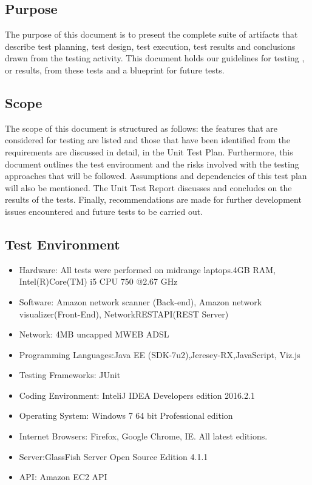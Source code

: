 \documentclass[hidelinks,a4paper,12pt]{article}
\begin{document}
\subsection{Purpose}
The purpose of this document is to present the complete suite of artifacts that describe test planning, test design, test execution, test results and conclusions drawn from the testing activity. This document holds our guidelines for testing , or results, from these tests and a blueprint for future tests.


\subsection{Scope}
The scope of this document is structured as follows: the features that are considered for
testing are listed and those that have been identified from the requirements are
discussed in detail, in the Unit Test Plan. Furthermore, this document outlines the test environment
and the risks involved with the testing approaches that will be followed. Assumptions and
dependencies of this test plan will also be mentioned. The Unit Test Report
discusses and concludes on the results of the tests. Finally, recommendations are made for further development issues encountered and future tests to be carried out.

\subsection{ Test Environment}



\begin{itemize}
  \item Hardware: All tests were performed on midrange laptops.4GB RAM, Intel(R)Core(TM) i5 CPU 750 @2.67 GHz
\item Software: Amazon network scanner (Back-end), Amazon network visualizer(Front-End), NetworkRESTAPI(REST Server)
\item Network: 4MB uncapped MWEB ADSL
  \item Programming Languages:Java EE (SDK-7u2),Jeresey-RX,JavaScript, Viz.js
  \item Testing Frameworks: JUnit
\item Coding Environment: InteliJ IDEA Developers edition 2016.2.1
\item Operating System: Windows 7 64 bit Professional edition
\item Internet Browsers: Firefox, Google Chrome, IE. All latest editions. 
\item Server:GlassFish Server Open Source Edition 4.1.1 
\item API: Amazon EC2 API 
\end{itemize}
\end{document}
